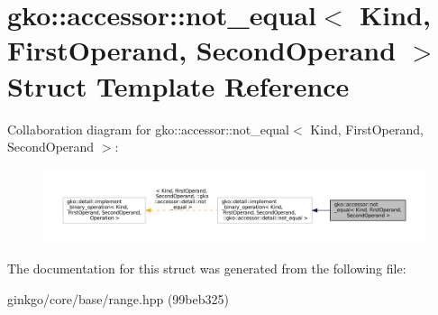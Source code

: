 \hypertarget{structgko_1_1accessor_1_1not__equal}{}\section{gko\+:\+:accessor\+:\+:not\+\_\+equal$<$ Kind, First\+Operand, Second\+Operand $>$ Struct Template Reference}
\label{structgko_1_1accessor_1_1not__equal}


Collaboration diagram for gko\+:\+:accessor\+:\+:not\+\_\+equal$<$ Kind, First\+Operand, Second\+Operand $>$\+:
\nopagebreak
\begin{figure}[H]
\begin{center}
\leavevmode
\includegraphics[width=350pt]{structgko_1_1accessor_1_1not__equal__coll__graph}
\end{center}
\end{figure}


The documentation for this struct was generated from the following file\+:\begin{DoxyCompactItemize}
\item 
ginkgo/core/base/range.\+hpp (99beb325)\end{DoxyCompactItemize}
